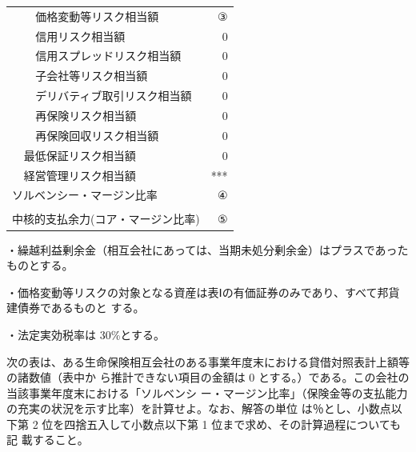 \documentclass[report,gutter=10mm,fore-edge=10mm,uplatex,dvipdfmx]{jlreq}
\begin{document}
\begin{tabular}{|l|l|l|l|r|}
&& \multicolumn{2}{l|}{価格変動等リスク相当額} & ③ \\ \cline{3-5}
&& \multicolumn{2}{l|}{信用リスク相当額} & 0 \\ \cline{3-5}
&& \multicolumn{2}{l|}{信用スプレッドリスク相当額} & 0 \\ \cline{3-5}
&& \multicolumn{2}{l|}{子会社等リスク相当額} & 0 \\ \cline{3-5}
&& \multicolumn{2}{l|}{デリバティブ取引リスク相当額} & 0 \\ \cline{3-5}
&& \multicolumn{2}{l|}{再保険リスク相当額} & 0 \\ \cline{3-5}
&& \multicolumn{2}{l|}{再保険回収リスク相当額} & 0 \\ \cline{2-5}
& \multicolumn{3}{|l|}{最低保証リスク相当額} & 0\\ \cline{2-5}
& \multicolumn{3}{|l|}{経営管理リスク相当額} & ***\\ \cline{1-5}
 \multicolumn{4}{|l|}{ソルベンシー・マージン比率 } & ④\\ \cline{1-5}
 \multicolumn{5}{c}{  }\\\cline{1-5}
 \multicolumn{4}{|l|}{中核的支払余力(コア・マージン比率)} & ⑤\\ \cline{1-5}
\end{tabular}

・繰越利益剰余金（相互会社にあっては、当期未処分剰余金）はプラスであったものとする。

・価格変動等リスクの対象となる資産は表Ⅰの有価証券のみであり、すべて邦貨建債券であるものと
する。

・法定実効税率は 30\%とする。

次の表は、ある生命保険相互会社のある事業年度末における貸借対照表計上額等の諸数値（表中か
ら推計できない項目の金額は 0 とする。）である。この会社の当該事業年度末における「ソルベンシ
ー・マージン比率」（保険金等の支払能力の充実の状況を示す比率）を計算せよ。なお、解答の単位
は％とし、小数点以下第 2 位を四捨五入して小数点以下第 1 位まで求め、その計算過程についても記
載すること。
\end{document}

